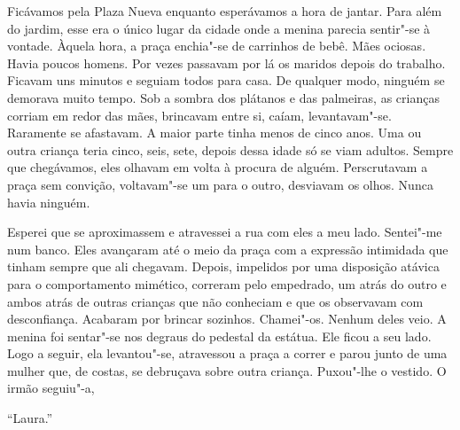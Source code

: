 Ficávamos pela Plaza Nueva enquanto esperávamos a hora de jantar. Para
além do jardim, esse era o único lugar da cidade onde a menina parecia
sentir"-se à vontade. Àquela hora, a praça enchia"-se de carrinhos de
bebê. Mães ociosas. Havia poucos homens. Por vezes passavam por lá os
maridos depois do trabalho. Ficavam uns minutos e seguiam todos para
casa. De qualquer modo, ninguém se demorava muito tempo. Sob a sombra
dos plátanos e das palmeiras, as crianças corriam em redor das mães,
brincavam entre si, caíam, levantavam"-se. Raramente se afastavam. A
maior parte tinha menos de cinco anos. Uma ou outra criança teria cinco,
seis, sete, depois dessa idade só se viam adultos. Sempre que
chegávamos, eles olhavam em volta à procura de alguém. Perscrutavam a
praça sem convição, voltavam"-se um para o outro, desviavam os olhos.
Nunca havia ninguém.

Esperei que se aproximassem e atravessei a rua com eles a meu lado.
Sentei"-me num banco. Eles avançaram até o meio da praça com a
expressão intimidada que tinham sempre que ali chegavam. Depois,
impelidos por uma disposição atávica para o comportamento mimético,
correram pelo empedrado, um atrás do outro e ambos atrás de outras
crianças que não conheciam e que os observavam com desconfiança.
Acabaram por brincar sozinhos. Chamei"-os. Nenhum deles veio. A menina
foi sentar"-se nos degraus do pedestal da estátua. Ele ficou a seu lado.
Logo a seguir, ela levantou"-se, atravessou a praça a correr e parou
junto de uma mulher que, de costas, se debruçava sobre outra criança.
Puxou"-lhe o vestido. O irmão seguiu"-a,

``Laura.''

